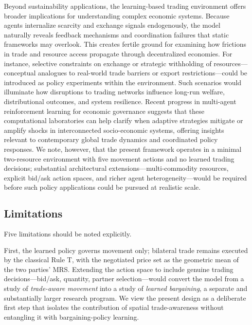 \documentclass[pdflatex,sn-mathphys-num]{sn-jnl}%
\theoremstyle{thmstyleone}%
\theoremstyle{thmstyletwo}%
\theoremstyle{thmstylethree}%
\begin{document}
Beyond sustainability applications, the learning-based trading environment offers broader implications for understanding complex economic systems. Because agents internalize scarcity and exchange signals endogenously, the model naturally reveals feedback mechanisms and coordination failures that static frameworks may overlook. This creates fertile ground for examining how frictions in trade and resource access propagate through decentralized economies. For instance, selective constraints on exchange or strategic withholding of resources---conceptual analogues to real-world trade barriers or export restrictions---could be introduced as policy experiments within the environment. Such scenarios would illuminate how disruptions to trading networks influence long-run welfare, distributional outcomes, and system resilience. Recent progress in multi-agent reinforcement learning for economic governance \citep{RuddJones2025} suggests that these computational laboratories can help clarify when adaptive strategies mitigate or amplify shocks in interconnected socio-economic systems, offering insights relevant to contemporary global trade dynamics and coordinated policy responses.
We note, however, that the present framework operates in a minimal two-resource environment with five movement actions and no learned trading decisions; substantial architectural extensions---multi-commodity resources, explicit bid/ask action spaces, and richer agent heterogeneity---would be required before such policy applications could be pursued at realistic scale.

\subsection{Limitations}
\label{sec:limitations}

Five limitations should be noted explicitly.

First, the learned policy governs movement only; bilateral trade remains executed by the classical Rule T, with the negotiated price set as the geometric mean of the two parties' MRS.  
Extending the action space to include genuine trading decisions---bid/ask, quantity, partner selection---would convert the model from a study of \emph{trade-aware movement} into a study of \emph{learned bargaining}, a separate and substantially larger research program.  
We view the present design as a deliberate first step that isolates the contribution of spatial trade-awareness without entangling it with bargaining-policy learning.
\end{document}
